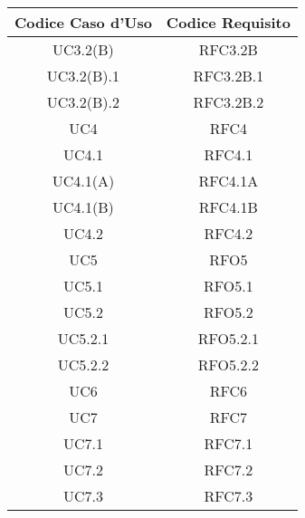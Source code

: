         \begin{table}[!htbp] %
            \centering
            \renewcommand{\arraystretch}{2} %
                \begin{tabular}{|c|c|} %
                \rowcolor{orange!50} %
        		\hline
        		\textbf{Codice Caso d'Uso} & \textbf{Codice Requisito} \\
                \hline
                UC3.2(B) & RFC3.2B\\
                \hline
                UC3.2(B).1 & RFC3.2B.1\\
                \hline
                UC3.2(B).2 & RFC3.2B.2\\
                \hline
                UC4 & RFC4\\
                \hline
                UC4.1 & RFC4.1\\
                \hline
                UC4.1(A) & RFC4.1A\\
                \hline
                UC4.1(B) & RFC4.1B\\
                \hline
                UC4.2 & RFC4.2\\
                \hline
                UC5 & RFO5\\
                \hline
                UC5.1 & RFO5.1\\
                \hline
                UC5.2 & RFO5.2\\
                \hline
                UC5.2.1 & RFO5.2.1\\
                \hline
                UC5.2.2 & RFO5.2.2\\
                \hline
                UC6 & RFC6\\
                \hline
                UC7 & RFC7\\
                \hline
                UC7.1 & RFC7.1\\
                \hline
                UC7.2 & RFC7.2\\
                \hline
                UC7.3 & RFC7.3\\
                \hline
                \end{tabular}
        \end{table}

